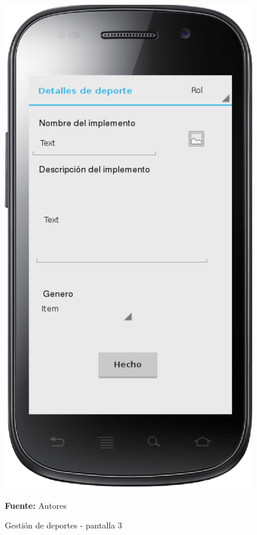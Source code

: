 \begin{figure}[!htb]
  \begin{center}
    \includegraphics[width=11cm]{./imagenes/UI/Deportes/gestion_deportes_3.png}
    \caption{Gestión de deportes - pantalla 3}
    \label{fig:gestion_deportes_3}
    \textbf{Fuente:}  Autores
  \end{center}
\end{figure}

